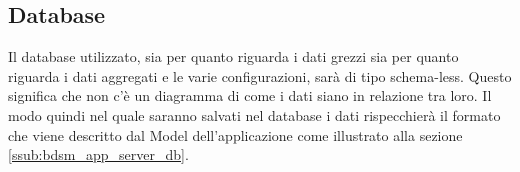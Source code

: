%


\subsection{Database} %
\label{sec:database}
Il database utilizzato, sia per quanto riguarda i dati grezzi sia per quanto riguarda i dati aggregati e le varie configurazioni, sarà di tipo schema-less. Questo significa che non c'è un diagramma di come i dati siano in relazione tra loro. \newline
Il modo quindi nel quale saranno salvati nel database i dati rispecchierà il formato che viene descritto dal Model dell'applicazione come illustrato alla sezione \ref{ssub:bdsm_app_server_db}.



